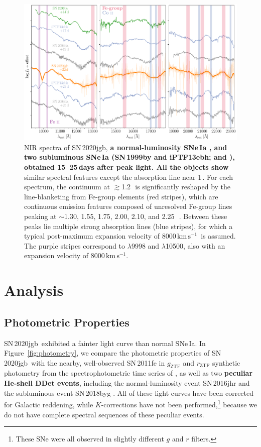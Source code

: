 \documentclass[twocolumn]{aastex631}
\newcommand{\sn}{SN\,2020jgb}
\newcommand{\kms}{$\mathrm{km}\,\mathrm{s}^{-1}$}
\newcommand{\revise}[1]{\textbf{#1}}
\begin{document}
\begin{figure}
    \centering
    \includegraphics[width=\textwidth]{NIR_spec.pdf}
    \caption{NIR spectra of \sn, \revise{a normal-luminosity SNe\,Ia \citep[SN\,2004da;][]{Marion2009_NIR}, and two subluminous SNe\,Ia (SN\,1999by and iPTF13ebh; \citealp{Hoeflich_2002} and \citealp{Hsiao_13ebh_2015}), obtained 15--25\,days after peak light. All the objects show} similar spectral features except the absorption line near 1\,\micron. For each spectrum, the continuum at $\gtrsim$1.2\,\micron\ is significantly reshaped by the line-blanketing from Fe-group elements (red stripes), which are continuous emission features composed of unresolved Fe-group lines peaking at $\sim$1.30, 1.55, 1.75, 2.00, 2.10, and 2.25\,\micron\ \citep{Marion2009_NIR}. Between these peaks lie multiple strong  absorption lines (blue stripes), for which a typical post-maximum expansion velocity of 8000\,\kms\ is assumed. The purple stripes correspond to  $\lambda$9998 and  $\lambda$10500, also with an expansion velocity of 8000\,\kms.}
    \label{fig:NIR_spec}
\end{figure}

\section{Analysis} \label{sec:analysis}
\subsection{Photometric Properties} \label{sec:phot_analysis}
\sn\ exhibited a fainter light curve than normal SNe\,Ia. In Figure~\ref{fig:photometry}, we compare the photometric properties of \sn\ with the nearby, well-observed SN\,2011fe in $g_\mathrm{ZTF}$ and $r_\mathrm{ZTF}$ synthetic photometry from the spectrophotometric time series of \citet{Pereira_2013}, as well as two \revise{peculiar He-shell DDet events}, including the normal-luminosity event SN\,2016jhr \citep{jiang_16jhr_2017} and the subluminous event SN\,2018byg \citep{de_18byg_2019}. All of these light curves have been corrected for Galactic reddening, while $K$-corrections have not been performed,\footnote{These SNe were all observed in slightly different $g$ and $r$ filters.} because we do not have complete spectral sequences of these peculiar events.
\end{document}
